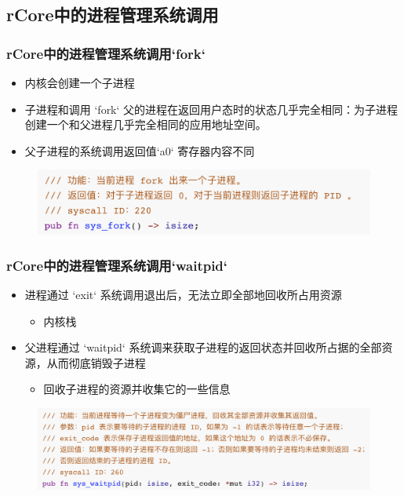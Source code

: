 \subsection{rCore中的进程管理系统调用}
% 
\begin{frame}[fragile]
    \frametitle{rCore中的进程管理系统调用`fork`}
    \begin{itemize}
        \item 内核会创建一个子进程
        \item 子进程和调用 `fork` 父的进程在返回用户态时的状态几乎完全相同：为子进程创建一个和父进程几乎完全相同的应用地址空间。
        \item 父子进程的系统调用返回值`a0` 寄存器内容不同
    \end{itemize}
% 
	\begin{figure}
		\centering
		\includegraphics[width=0.9\linewidth]{figs/fork.png}
	\end{figure}



% 
\end{frame}
\begin{frame}[fragile]
    \frametitle{rCore中的进程管理系统调用`waitpid`}
    \begin{itemize}
        \item 进程通过 `exit` 系统调用退出后，无法立即全部地回收所占用资源
    \begin{itemize}
        \item 内核栈
    \end{itemize}
        \item 父进程通过 `waitpid` 系统调来获取子进程的返回状态并回收所占据的全部资源，从而彻底销毁子进程
    \begin{itemize}
        \item 回收子进程的资源并收集它的一些信息
    \end{itemize}
    \end{itemize}
% 
	\begin{figure}
		\centering
		\includegraphics[width=0.7\linewidth]{figs/waitpid.png}
	\end{figure}



% 
\end{frame}

